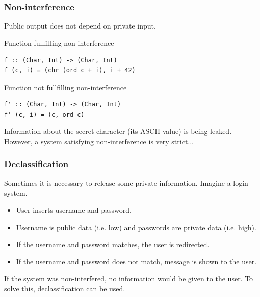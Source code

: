\documentclass{beamer}
\begin{document}

\begin{frame}[fragile]
  \frametitle{Non-interference}
  Public output does not depend on private input. \pause

  \begin{block}{Function fullfilling non-interference}
\begin{verbatim}
f :: (Char, Int) -> (Char, Int)
f (c, i) = (chr (ord c + i), i + 42)
\end{verbatim}
  \end{block}
  \pause
  \begin{block}{Function not fullfilling non-interference}
\begin{verbatim}
f' :: (Char, Int) -> (Char, Int)
f' (c, i) = (c, ord c)
\end{verbatim}
  \end{block}
  \pause
  Information about the secret character (its ASCII value) is being leaked.
  \pause
  \newline
  However, a system satisfying non-interference is very strict...
\end{frame}


\begin{frame}
  \frametitle{Declassification}
  Sometimes it is necessary to release some private information.\pause
  \newline
  Imagine a login system. \pause
  \begin{itemize}
    \item User inserts username and password.
    \item Username is public data (i.e. low) and passwords are private data (i.e. high).
    \item If the username and password matches, the user is redirected.
    \item If the username and password does not match, message is shown to the user.
  \end{itemize}
  \pause
  If the system was non-interfered, no information would be given to the user.\pause
  \newline
  To solve this, declassification can be used.
\end{frame}

\end{document}
